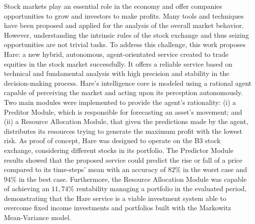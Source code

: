 
Stock markets play an essential role in the economy and offer companies opportunities to grow and investors to make profits. Many tools and techniques have been proposed and applied for the analysis of the overall market behavior. However, understanding the intrinsic rules of the stock exchange and thus seizing opportunities are not trivial tasks. To address this challenge, this work proposes Hare: a new hybrid, autonomous, agent-orientated service created to trade equities in the stock market successfully. It offers a reliable service based on technical and fundamental analysis with high precision and stability in the decision-making process. Hare's intelligence core is modeled using a rational agent capable of perceiving the market and acting upon its perception autonomously.  Two main modules were implemented to provide the agent's rationality: (i) a Preditor Module, which is responsible for forecasting an asset's movement; and (ii) a Resource Allocation Module, that given the predictions made by the agent, distributes its resources trying to generate the maximum profit with the lowest risk. As proof of concept, Hare was designed to operate on the B3 stock exchange, considering different stocks in its portfolio. The Predictor Module results showed that the proposed service could predict the rise or fall of a price compared to its time-steps' mean with an accuracy of $82\%$ in the worst case and $94\%$ in the best case. Furthermore, the Resource Allocation Module was capable of achieving an $11,74\%$ rentability managing a portfolio in the evaluated period, demonstrating that the Hare service is a viable investment system able to overcome fixed income investments and portfolios built with the Markowitz Mean-Variance model.
